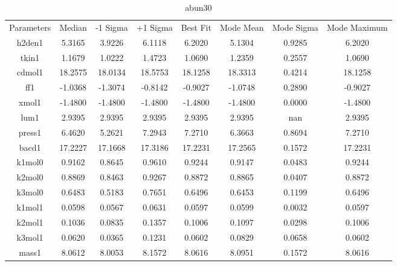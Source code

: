 \begin{table}
\caption{abun30}
\begin{tabular}{cccccccc}
Parameters & Median & -1 Sigma & +1 Sigma & Best Fit & Mode Mean & Mode Sigma & Mode Maximum \\
h2den1 & 5.3165 & 3.9226 & 6.1118 & 6.2020 & 5.1304 & 0.9285 & 6.2020 \\
tkin1 & 1.1679 & 1.0222 & 1.4723 & 1.0690 & 1.2359 & 0.2557 & 1.0690 \\
cdmol1 & 18.2575 & 18.0134 & 18.5753 & 18.1258 & 18.3313 & 0.4214 & 18.1258 \\
ff1 & -1.0368 & -1.3074 & -0.8142 & -0.9027 & -1.0748 & 0.2890 & -0.9027 \\
xmol1 & -1.4800 & -1.4800 & -1.4800 & -1.4800 & -1.4800 & 0.0000 & -1.4800 \\
lum1 & 2.9395 & 2.9395 & 2.9395 & 2.9395 & 2.9395 & nan & 2.9395 \\
press1 & 6.4620 & 5.2621 & 7.2943 & 7.2710 & 6.3663 & 0.8694 & 7.2710 \\
bacd1 & 17.2227 & 17.1668 & 17.3186 & 17.2231 & 17.2565 & 0.1572 & 17.2231 \\
k1mol0 & 0.9162 & 0.8645 & 0.9610 & 0.9244 & 0.9147 & 0.0483 & 0.9244 \\
k2mol0 & 0.8869 & 0.8463 & 0.9267 & 0.8872 & 0.8865 & 0.0407 & 0.8872 \\
k3mol0 & 0.6483 & 0.5183 & 0.7651 & 0.6496 & 0.6453 & 0.1199 & 0.6496 \\
k1mol1 & 0.0598 & 0.0567 & 0.0631 & 0.0597 & 0.0599 & 0.0032 & 0.0597 \\
k2mol1 & 0.1036 & 0.0835 & 0.1357 & 0.1006 & 0.1097 & 0.0298 & 0.1006 \\
k3mol1 & 0.0620 & 0.0365 & 0.1231 & 0.0602 & 0.0829 & 0.0658 & 0.0602 \\
mass1 & 8.0612 & 8.0053 & 8.1572 & 8.0616 & 8.0951 & 0.1572 & 8.0616 \\
\end{tabular}
\end{table}
